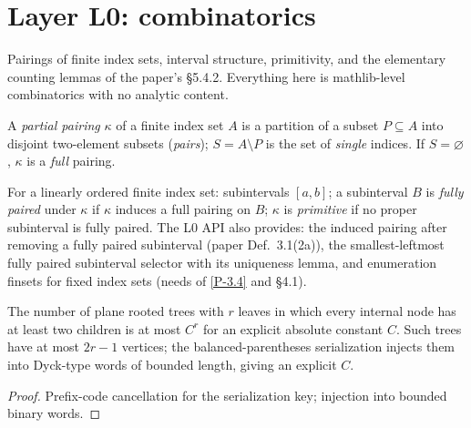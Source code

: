 \chapter{Layer L0: combinatorics}\label{ch:combinatorics}

Pairings of finite index sets, interval structure, primitivity, and the
elementary counting lemmas of the paper's \S5.4.2. Everything here is
mathlib-level combinatorics with no analytic content.

\begin{definition}\label{D-pair}
  \leanok
  A \emph{partial pairing} \(\kappa\) of a finite index set \(A\) is a
  partition of a subset \(P \subseteq A\) into disjoint two-element
  subsets (\emph{pairs}); \(S = A \setminus P\) is the set of
  \emph{single} indices. If \(S = \varnothing\), \(\kappa\) is a
  \emph{full} pairing.
\end{definition}

\begin{definition}\label{D-int}
  \leanok
  For a linearly ordered finite index set: subintervals \([a,b]\); a
  subinterval \(B\) is \emph{fully paired} under \(\kappa\) if \(\kappa\)
  induces a full pairing on \(B\); \(\kappa\) is \emph{primitive} if no
  proper subinterval is fully paired. The L0 API also provides: the
  induced pairing after removing a fully paired subinterval
  (paper Def.~3.1(2a)), the smallest-leftmost fully paired subinterval
  selector with its uniqueness lemma, and enumeration finsets for fixed
  index sets (needs of \ref{P-3.4} and \S4.1).
\end{definition}

\begin{lemma}\label{L-5.2}
  \leanok
  The number of plane rooted trees with \(r\) leaves in which every
  internal node has at least two children is at most \(C^r\) for an
  explicit absolute constant \(C\).
  Such trees have at most \(2r-1\) vertices; the balanced-parentheses
  serialization injects them into Dyck-type words of bounded length,
  giving an explicit \(C\).
\end{lemma}
\begin{proof}\leanok
  Prefix-code cancellation for the serialization key; injection into
  bounded binary words.
\end{proof}

